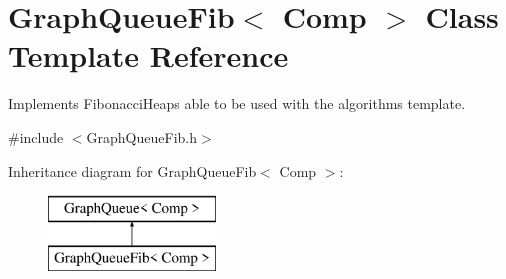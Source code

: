 \hypertarget{class_graph_queue_fib}{}\section{Graph\+Queue\+Fib$<$ Comp $>$ Class Template Reference}
\label{class_graph_queue_fib}


Implements Fibonacci\+Heaps able to be used with the algorithm\textquotesingle{}s template.  




{\ttfamily \#include $<$Graph\+Queue\+Fib.\+h$>$}

Inheritance diagram for Graph\+Queue\+Fib$<$ Comp $>$\+:\begin{figure}[H]
\begin{center}
\leavevmode
\includegraphics[height=2.000000cm]{class_graph_queue_fib}
\end{center}
\end{figure}
